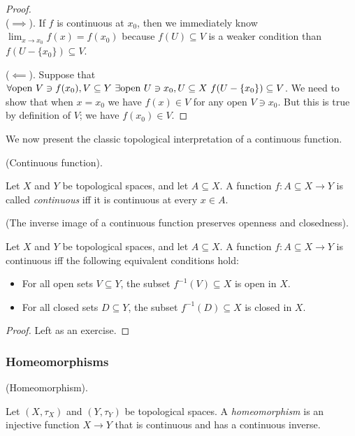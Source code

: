 \begin{proof}
    \mbox{} \\
    \indent ($\implies$). If $f$ is continuous at $x_0$, then we immediately know $\lim_{x \rightarrow x_0} f(x) = f(x_0)$ because $f(U) \subseteq V$ is a weaker condition than $f(U - \{x_0\}) \subseteq V$. 
    
    ($\impliedby$). Suppose that $\forall \text{open } V \ni f(x_0), V \subseteq Y \text{ } \exists \text{open } U \ni x_0, U \subseteq X \text{ } f(U - \{x_0\}) \subseteq V$. We need to show that when $x = x_0$ we have $f(x) \in V$ for any open $V \ni x_0$. But this is true by definition of $V$; we have $f(x_0) \in V$.
\end{proof}

We now present the classic topological interpretation of a continuous function.

\begin{defn}
    (Continuous function).
    
    Let $X$ and $Y$ be topological spaces, and let $A \subseteq X$. A function $f:A \subseteq X \rightarrow Y$ is called \textit{continuous} iff it is continuous at every $x \in A$.
\end{defn}

\begin{theorem}
    (The inverse image of a continuous function preserves openness and closedness).
    
    Let $X$ and $Y$ be topological spaces, and let $A \subseteq X$. A function $f:A \subseteq X \rightarrow Y$ is continuous iff the following equivalent conditions hold:
    
    \begin{itemize}
        \item For all open sets $V \subseteq Y$, the subset $f^{-1}(V) \subseteq X$ is open in $X$.
        \item For all closed sets $D \subseteq Y$, the subset $f^{-1}(D) \subseteq X$ is closed in $X$.
    \end{itemize}
\end{theorem}

\begin{proof}
    Left as an exercise.
\end{proof}

\subsubsection*{Homeomorphisms}

\begin{defn}
    (Homeomorphism).
    
    Let $(X, \tau_X)$ and $(Y, \tau_Y)$ be topological spaces. A \textit{homeomorphism} is an injective function ${X \rightarrow Y}$ that is continuous and has a continuous inverse.
\end{defn}

